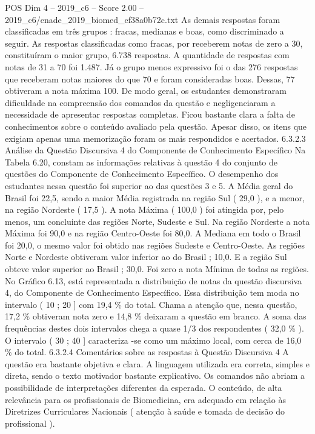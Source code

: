 \begin{textsample}{POS Dim 4 – 2019\_c6 – Score 2.00 – 2019\_c6/enade\_2019\_biomed\_ef38a0b72c.txt}
As demais respostas foram classificadas em três grupos : fracas, medianas e boas, como discriminado a seguir.
As respostas classificadas como fracas, por receberem notas de zero a 30, constituíram o maior grupo, 6.738 respostas.
A quantidade de respostas com notas de 31 a 70 foi 1.487.
Já o grupo menos expressivo foi o das 276 respostas que receberam notas maiores do que 70 e foram consideradas boas.
Dessas, 77 obtiveram a nota máxima 100.
De modo geral, os estudantes demonstraram dificuldade na compreensão dos comandos da questão e negligenciaram a necessidade de apresentar respostas completas.
Ficou bastante clara a falta de conhecimentos sobre o conteúdo avaliado pela questão.
Apesar disso, os itens que exigiam apenas uma memorização foram os mais respondidos e acertados. 6.3.2.3 Análise da Questão Discursiva 4 do Componente de Conhecimento Específico Na Tabela 6.20, constam as informações relativas à questão 4 do conjunto de questões do Componente de Conhecimento Específico.
O desempenho dos estudantes nessa questão foi superior ao das questões 3 e 5.
A Média geral do Brasil foi 22,5, sendo a maior Média registrada na região Sul ( 29,0 ), e a menor, na região Nordeste ( 17,5 ).
A nota Máxima ( 100,0 ) foi atingida por, pelo menos, um concluinte das regiões Norte, Sudeste e Sul.
Na região Nordeste a nota Máxima foi 90,0 e na região Centro-Oeste foi 80,0.
A Mediana em todo o Brasil foi 20,0, o mesmo valor foi obtido nas regiões Sudeste e Centro-Oeste.
As regiões Norte e Nordeste obtiveram valor inferior ao do Brasil ; 10,0.
E a região Sul obteve valor superior ao Brasil ; 30,0.
Foi zero a nota Mínima de todas as regiões.
No Gráfico 6.13, está representada a distribuição de notas da questão discursiva 4, do Componente de Conhecimento Específico.
Essa distribuição tem moda no intervalo ( 10 ; 20 ] com 19,4 \% do total.
Chama a atenção que, nessa questão, 17,2 \% obtiveram nota zero e 14,8 \% deixaram a questão em branco.
A soma das frequências destes dois intervalos chega a quase 1/3 dos respondentes ( 32,0 \% ).
O intervalo ( 30 ; 40 ] caracteriza -se como um máximo local, com cerca de 16,0 \% do total. 6.3.2.4 Comentários sobre as respostas à Questão Discursiva 4 A questão era bastante objetiva e clara.
A linguagem utilizada era correta, simples e direta, sendo o texto motivador bastante explicativo.
Os comandos não abriam a possibilidade de interpretações diferentes da esperada.
O conteúdo, de alta relevância para os profissionais de Biomedicina, era adequado em relação às Diretrizes Curriculares Nacionais ( atenção à saúde e tomada de decisão do profissional ).

\end{textsample}
